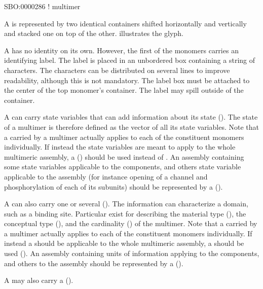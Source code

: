 \begin{glyphDescription}

\glyphSboTerm SBO:0000286 ! multimer

\glyphContainer A  is represented by two identical containers shifted horizontally and vertically and stacked one on top of the other.   illustrates the glyph.

\glyphLabel A  has no identity on its own.  However, the first of the monomers carries an identifying label.  The label is placed in an unbordered box containing a string of characters.  The characters can be distributed on several lines to improve readability, although this is not mandatory.  The label box must be attached to the center of the top monomer's container.  The label may spill outside of the container.

\glyphAux A  can carry state variables that can add information about its state ().  The state of a multimer is therefore defined as the vector of all its state variables.  Note that a  carried by a multimer actually applies to each of the constituent monomers individually.  If instead the state variables are meant to apply to the whole multimeric assembly, a  () should be used instead of .  An assembly containing some state variables applicable to the components, and others state variable applicable to the assembly (for instance opening of a channel and phosphorylation of each of its subunits) should be represented by a  ().

A  can also carry one or several  ().  The information can characterize a domain, such as a binding site.  Particular  exist for describing the material type (), the conceptual type (), and the cardinality () of the multimer.  Note that a  carried by a multimer actually applies to each of the constituent monomers individually.  If instead a  should be applicable to the whole multimeric assembly, a  should be used (). An assembly containing units of information applying to the components, and others to the assembly should be represented by a  ().

A  may also carry a  ().

\end{glyphDescription}


